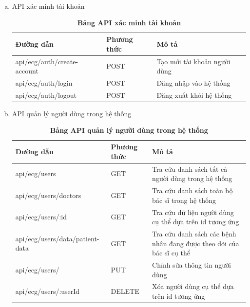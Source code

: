 \begin{enumerate}[a)]
  \item API xác minh tài khoản

  \begin{xltabular}{\textwidth}{
    | >{\raggedright\arraybackslash}m{4.6cm}
    | >{\centering\arraybackslash}m{2.8cm}
    | >{\raggedright\arraybackslash}X |
    }
    \caption{\bfseries \fontsize{12pt}{0pt}\selectfont Bảng API xác minh tài khoản}
    \label{table_api_auth}
    \\
    \hline
    \bfseries Đường dẫn    &\bfseries Phương thức    &\bfseries Mô tả\\ \hline
    api/ecg/auth/create-account   &   POST  & Tạo mới tài khoản người dùng \\ \hline
    api/ecg/auth/login   &    POST    & Đăng nhập vào hệ thống \\ \hline
    api/ecg/auth/logout   &    POST    & Đăng xuất khỏi hệ thống \\ \hline
  \end{xltabular}

  \item API quản lý người dùng trong hệ thống
  \begin{xltabular}{\textwidth}{
    | >{\raggedright\arraybackslash}m{4.6cm}
    | >{\centering\arraybackslash}m{2.8cm}
    | >{\raggedright\arraybackslash}X |
    }
    \caption{\bfseries \fontsize{12pt}{0pt}\selectfont Bảng API quản lý người dùng trong hệ thống}
    \label{table_api_user}
    \\
    \hline
    \bfseries Đường dẫn    &\bfseries Phương thức    &\bfseries Mô tả\\ \hline
    api/ecg/users   &   GET  &  Tra cứu danh sách tất cả người dùng trong hệ thống\\  \hline
	api/ecg/users/doctors   &   GET  &  Tra cứu danh sách toàn bộ bác sĩ trong hệ thống \\  \hline
	api/ecg/users/:id   &   GET  &  Tra cứu dữ liệu người dùng cụ thể dựa trên id tương ứng \\  \hline
	api/ecg/users/data/patient-data   &   GET  &  Tra cứu danh sách các bệnh nhân đang được theo dõi của bác sĩ cụ thể \\  \hline
	api/ecg/users/   &   PUT  &  Chỉnh sửa thông tin người dùng \\  \hline
	api/ecg/users/:userId  &   DELETE  &  Xóa người dùng cụ thể dựa trên id tương ứng \\  \hline
  \end{xltabular}


\end{enumerate}
